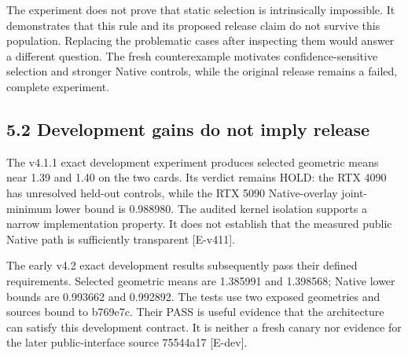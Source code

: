 \documentclass[11pt,a4paper]{article}
\begin{document}
The experiment does not prove that static selection is intrinsically impossible. It demonstrates that this rule and its proposed release claim do not survive this population. Replacing the problematic cases after inspecting them would answer a different question. The fresh counterexample motivates confidence-sensitive selection and stronger Native controls, while the original release remains a failed, complete experiment.


\subsection*{5.2 Development gains do not imply release}

The v4.1.1 exact development experiment produces selected geometric means near 1.39 and 1.40 on the two cards. Its verdict remains HOLD: the RTX 4090 has unresolved held-out controls, while the RTX 5090 Native-overlay joint-minimum lower bound is 0.988980. The audited kernel isolation supports a narrow implementation property. It does not establish that the measured public Native path is sufficiently transparent [E-v411].


The early v4.2 exact development results subsequently pass their defined requirements. Selected geometric means are 1.385991 and 1.398568; Native lower bounds are 0.993662 and 0.992892. The tests use two exposed geometries and sources bound to b769e7c. Their PASS is useful evidence that the architecture can satisfy this development contract. It is neither a fresh canary nor evidence for the later public-interface source 75544a17 [E-dev].
\end{document}

